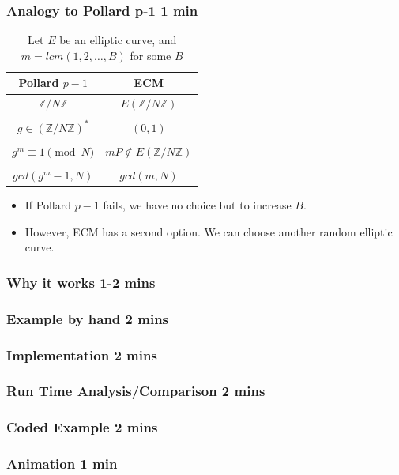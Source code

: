\documentclass{beamer}
\begin{document}
\begin{frame}
\frametitle{Analogy to Pollard p-1 1 min}
\begin{table}[h!]
  \begin{center}
    \caption{Let $E$ be an elliptic curve, and $m = lcm(1,2,\ldots,B)$ for some $B$}
    \label{tab:table1}
    \begin{tabular}{|c|c|} %
      \textbf{Pollard $p-1$} & \textbf{ECM} \\
      \hline
      $\mathbb{Z}/N\mathbb{Z}$ & $E\left( \mathbb{Z}/N\mathbb{Z} \right)$\\ &\\
      $g \in (\mathbb{Z}/N\mathbb{Z})^*$ & $(0,1)$ \\ & \\
      $g^m \equiv 1 \pmod{N}$ & $mP \notin E\left( \mathbb{Z}/N\mathbb{Z} \right)$ \\ &\\
      $gcd(g^m-1, N)$ & $gcd(m,N)$
    \end{tabular}
  \end{center}
\end{table}

\begin{itemize}
\item If Pollard $p-1$ fails, we have no choice but to increase $B$. 
\item However, ECM has a second option. We can choose another random elliptic curve. 
\end{itemize}
\end{frame}

\begin{frame}
\frametitle{Why it works 1-2 mins}

\end{frame}

\begin{frame}
\frametitle{Example by hand 2 mins}

\end{frame}

\begin{frame}
\frametitle{Implementation 2 mins}

\end{frame}

\begin{frame}
\frametitle{Run Time Analysis/Comparison 2 mins}

\end{frame}

\begin{frame}
\frametitle{Coded Example 2 mins}

\end{frame}

\begin{frame}
\frametitle{Animation 1 min}

\end{frame}
\end{document}
